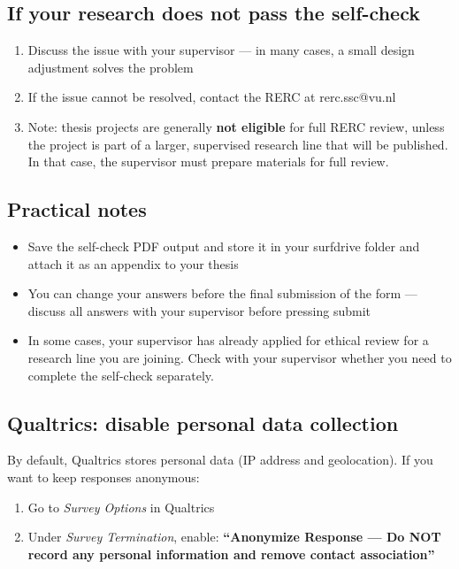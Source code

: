 \documentclass[
  11pt,
  a4paper,
]{scrbook}
\providecommand{\tightlist}{%
  \setlength{\itemsep}{0pt}\setlength{\parskip}{0pt}}\usepackage{longtable,booktabs,array}
\begin{document}
\subsection{If your research does not pass the
self-check}\label{if-your-research-does-not-pass-the-self-check}

\begin{enumerate}
\def\labelenumi{\arabic{enumi}.}
\tightlist
\item
  Discuss the issue with your supervisor --- in many cases, a small
  design adjustment solves the problem
\item
  If the issue cannot be resolved, contact the RERC at rerc.ssc@vu.nl
\item
  Note: thesis projects are generally \textbf{not eligible} for full
  RERC review, unless the project is part of a larger, supervised
  research line that will be published. In that case, the supervisor
  must prepare materials for full review.
\end{enumerate}

\subsection{Practical notes}\label{practical-notes}

\begin{itemize}
\tightlist
\item
  Save the self-check PDF output and store it in your surfdrive folder
  and attach it as an appendix to your thesis
\item
  You can change your answers before the final submission of the form
  --- discuss all answers with your supervisor before pressing submit
\item
  In some cases, your supervisor has already applied for ethical review
  for a research line you are joining. Check with your supervisor
  whether you need to complete the self-check separately.
\end{itemize}

\subsection{Qualtrics: disable personal data
collection}\label{qualtrics-disable-personal-data-collection}

By default, Qualtrics stores personal data (IP address and geolocation).
If you want to keep responses anonymous:

\begin{enumerate}
\def\labelenumi{\arabic{enumi}.}
\tightlist
\item
  Go to \emph{Survey Options} in Qualtrics
\item
  Under \emph{Survey Termination}, enable: \textbf{``Anonymize Response
  --- Do NOT record any personal information and remove contact
  association''}
\end{enumerate}
\end{document}
